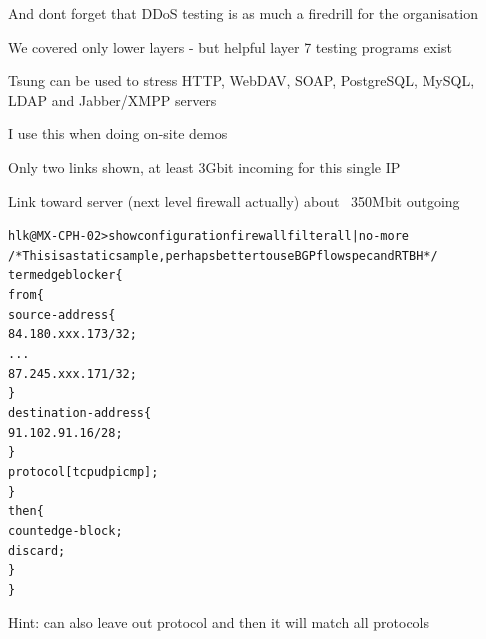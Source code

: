 \documentclass[20pt,landscape,a4paper,footrule]{foils}
\begin{document}
\vskip 2cm
\centerline{And dont forget that DDoS testing is as much a firedrill for the organisation}



\begin{list1}
\item We covered only lower layers - but helpful layer 7 testing programs exist
\item Tsung can be used to stress HTTP, WebDAV, SOAP, PostgreSQL, MySQL, LDAP and Jabber/XMPP servers 
\end{list1}

\myquestionspage




I use this when doing on-site demos




\centerline{Only two links shown, at least 3Gbit incoming for this single IP}

\centerline{Link toward server (next level firewall actually) about ~350Mbit outgoing}



\begin{alltt}\footnotesize
hlk@MX-CPH-02> show configuration firewall filter all | no-more
/* This is a static sample, perhaps better to use BGP flowspec and RTBH */
term edgeblocker \{
    from \{
        source-address \{
            84.180.xxx.173/32;
...
            87.245.xxx.171/32;
        \}
        destination-address \{
            91.102.91.16/28;
        \}
        protocol [ tcp udp icmp ];
    \}
    then \{
        count edge-block;
        discard;
    \}
\}
\end{alltt}
Hint: can also leave out protocol and then it will match all protocols

\end{document}
